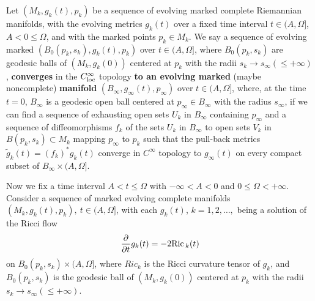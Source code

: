 \begin{definition}
  \label{def:cz-pointed-convergence-of-evolving-manifolds}
Let $(M_k,g_k(t),p_k)$ be a sequence of evolving marked complete
Riemannian manifolds, with the evolving metrics $g_k(t)$ over a
fixed time interval $t\in(A,\Omega]$, $A < 0 \leq \Omega$, and
with the marked points $p_k\in M_k$. We say a sequence of evolving
marked $(B_0(p_k,s_k),g_k(t),p_k)$ over $t \in (A,\Omega]$, where
$B_0(p_k,s_k)$ are geodesic balls of $(M_k,g_k(0))$ centered at
$p_k$ with the radii $s_k \rightarrow s_{\infty}(\leq +\infty)$,
{\bf converges} in the $C_{\rm loc}^{\infty}$ topology {\bf to an
evolving marked} (maybe noncomplete) {\bf
manifold}
$(B_{\infty},g_{\infty}(t),p_{\infty})$ over $t\in(A,\Omega]$,
where, at the time $t=0$, $B_{\infty}$ is a geodesic open ball
centered at $p_{\infty}\in B_{\infty}$ with the radius
$s_{\infty}$, if we can find a sequence of exhausting open sets
$U_k$ in $B_{\infty}$ containing $p_{\infty}$ and a sequence of
diffeomorphisms $f_k$ of the sets $U_k$ in $B_{\infty}$ to open
sets $V_k$ in $B(p_k,s_k) \subset M_k$ mapping $p_{\infty}$ to
$p_k$ such that the pull-back metrics
$\tilde{g}_k(t)=(f_k)^*g_k(t)$ converge in $C^\infty$ topology to
$g_{\infty}(t)$ on every compact subset of
$B_{\infty}\times(A,\Omega]$.
\end{definition}

Now we fix a time interval $A<t \leq \Omega$ with $-\infty < A<0$
and $0 \leq \Omega <+\infty$. Consider a sequence of marked
evolving complete manifolds $(M_k,g_k(t),p_k),\ t\in(A,\Omega]$,
with each $g_k(t)$, $k=1, 2, \ldots,$ being a solution of the
Ricci flow
$$
\frac{\partial}{\partial t}g_k(t)=-2{\rm Ric}\,_k(t)
$$
on $B_0(p_k,s_k) \times (A,\Omega]$, where $Ric_k$ is the Ricci
curvature tensor of $g_k$, and  $B_0(p_k,s_k)$ is the geodesic
ball of $(M_k,g_k(0))$ centered at $p_k$ with the radii $s_k
\rightarrow s_{\infty}(\leq +\infty)$.

